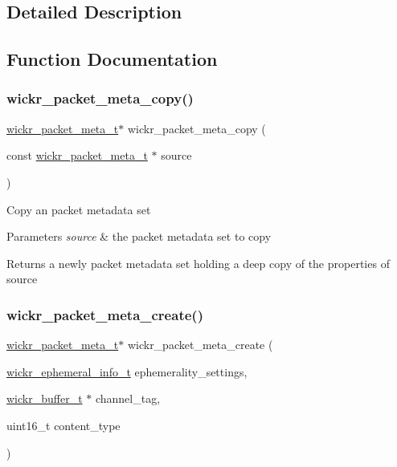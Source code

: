 \subsection{Detailed Description}


\subsection{Function Documentation}
\mbox{\label{group__wickr__packet__meta_ga1bb5a0f2a49069679b174b3e6521fe9b}} 
\subsubsection{\texorpdfstring{wickr\_packet\_meta\_copy()}{wickr\_packet\_meta\_copy()}}
{\footnotesize\ttfamily \mbox{\hyperlink{structwickr__packet__meta}{wickr\+\_\+packet\+\_\+meta\+\_\+t}}$\ast$ wickr\+\_\+packet\+\_\+meta\+\_\+copy (\begin{DoxyParamCaption}\item[{const \mbox{\hyperlink{structwickr__packet__meta}{wickr\+\_\+packet\+\_\+meta\+\_\+t}} $\ast$}]{source }\end{DoxyParamCaption})}

Copy an packet metadata set


\begin{DoxyParams}{Parameters}
{\em source} & the packet metadata set to copy \\
\hline
\end{DoxyParams}
\begin{DoxyReturn}{Returns}
a newly packet metadata set holding a deep copy of the properties of \textquotesingle{}source\textquotesingle{} 
\end{DoxyReturn}
\mbox{\label{group__wickr__packet__meta_ga146144d74da12c1fff766462fe7fa661}} 
\subsubsection{\texorpdfstring{wickr\_packet\_meta\_create()}{wickr\_packet\_meta\_create()}}
{\footnotesize\ttfamily \mbox{\hyperlink{structwickr__packet__meta}{wickr\+\_\+packet\+\_\+meta\+\_\+t}}$\ast$ wickr\+\_\+packet\+\_\+meta\+\_\+create (\begin{DoxyParamCaption}\item[{\mbox{\hyperlink{structwickr__ephemeral__info}{wickr\+\_\+ephemeral\+\_\+info\+\_\+t}}}]{ephemerality\+\_\+settings,  }\item[{\mbox{\hyperlink{structwickr__buffer}{wickr\+\_\+buffer\+\_\+t}} $\ast$}]{channel\+\_\+tag,  }\item[{uint16\+\_\+t}]{content\+\_\+type }\end{DoxyParamCaption})}

